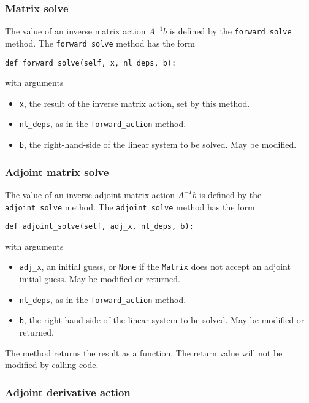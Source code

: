 \documentclass[11pt]{article}
\begin{document}
\subsubsection{Matrix solve}

The value of an inverse matrix action $A^{-1} b$ is defined by the
\texttt{forward\_solve} method. The \texttt{forward\_solve} method has the
form
\begin{lstlisting}
def forward_solve(self, x, nl_deps, b):
\end{lstlisting}
with arguments
\begin{itemize}
  \item \texttt{x}, the result of the inverse matrix action, set by this
    method.
  \item \texttt{nl\_deps}, as in the \texttt{forward\_action} method.
  \item \texttt{b}, the right-hand-side of the linear system to be solved. May
    be modified.
\end{itemize}

\subsubsection{Adjoint matrix solve}

The value of an inverse adjoint matrix action $A^{-T} b$ is defined by the
\texttt{adjoint\_solve} method. The \texttt{adjoint\_solve} method has the
form
\begin{lstlisting}
def adjoint_solve(self, adj_x, nl_deps, b):
\end{lstlisting}
with arguments
\begin{itemize}
  \item \texttt{adj\_x}, an initial guess, or \texttt{None} if the
    \texttt{Matrix} does not accept an adjoint initial guess. May be modified
    or returned.
  \item \texttt{nl\_deps}, as in the \texttt{forward\_action} method.
  \item \texttt{b}, the right-hand-side of the linear system to be solved. May
    be modified or returned.
\end{itemize}
The method returns the result as a function. The return value will not be
modified by calling code.

\subsubsection{Adjoint derivative action}
\end{document}
